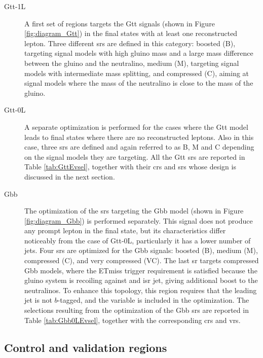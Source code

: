 \begin{description}

\item[Gtt-1L] A first set of regions targets the Gtt signals (shown in Figure \ref{fig:diagram_Gtt}) in the final states with at least one reconstructed lepton. Three different \glspl{sr} are defined in this category: boosted (B), targeting signal models with high gluino mass 
and a large mass difference between the gluino and the neutralino, medium (M), targeting signal models with intermediate mass splitting, and compressed (C), aiming at signal models where the mass of the neutralino is close to the mass of the gluino. 

\item[Gtt-0L] A separate optimization is performed for the cases where the Gtt model leads to final states where there are no reconstructed leptons.
Also in this case, three \glspl{sr} are defined and again referred to as B, M and C depending on the signal models they are targeting. 
All the Gtt \glspl{sr} are reported in Table \ref{tab:GttEvsel}, together with their \glspl{cr} and \glspl{sr} whose design is discussed in the next section. 

\item[Gbb] The optimization of the \glspl{sr} targeting the Gbb model (shown in Figure \ref{fig:diagram_Gbb}) is performed separately. 
This signal does not produce any prompt lepton in the final state, but its characteristics differ noticeably from 
the case of Gtt-0L, particularly it has a lower number of jets. 
Four \glspl{sr} are optimized for the Gbb signals: boosted (B), medium (M), compressed (C), and very compressed (VC). 
The last \gls{sr} targets compressed Gbb models, where the ETmiss trigger requirement is satisfied because the gluino system is recoiling against 
and \gls{isr} jet, giving additional boost to the neutralinos. To enhance this topology, this region requires that the leading jet is
not $b$-tagged, and 
the variable \dphilead is included in the optimization. The selections resulting from the optimization of the Gbb \glspl{sr} are 
reported in Table \ref{tab:Gbb0LEvsel}, together with the corresponding \glspl{cr} and \glspl{vr}.

\end{description}

\subsection{Control and validation regions}

